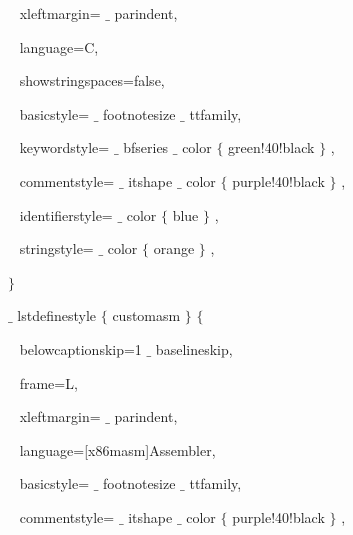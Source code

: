 {\fontsize{10pt}{10pt}\selectfont ~ xleftmargin= $ \_ $ parindent,}\par

{\fontsize{10pt}{10pt}\selectfont ~ language=C,}\par

{\fontsize{10pt}{10pt}\selectfont ~ showstringspaces=false,}\par

{\fontsize{10pt}{10pt}\selectfont ~ basicstyle= $ \_ $ footnotesize $ \_ $ ttfamily,}\par

{\fontsize{10pt}{10pt}\selectfont ~ keywordstyle= $ \_ $ bfseries $ \_ $ color $ \{ $ green!40!black $ \} $ ,}\par

{\fontsize{10pt}{10pt}\selectfont ~ commentstyle= $ \_ $ itshape $ \_ $ color $ \{ $ purple!40!black $ \} $ ,}\par

{\fontsize{10pt}{10pt}\selectfont ~ identifierstyle= $ \_ $ color $ \{ $ blue $ \} $ ,}\par

{\fontsize{10pt}{10pt}\selectfont ~ stringstyle= $ \_ $ color $ \{ $ orange $ \} $ ,}\par

{\fontsize{10pt}{10pt}\selectfont  $ \} $ }\par

{\fontsize{10pt}{10pt}\selectfont  $ \_ $ lstdefinestyle $ \{ $ customasm $ \} $  $ \{ $ }\par

{\fontsize{10pt}{10pt}\selectfont ~ belowcaptionskip=1 $ \_ $ baselineskip,}\par

{\fontsize{10pt}{10pt}\selectfont ~ frame=L,}\par

{\fontsize{10pt}{10pt}\selectfont ~ xleftmargin= $ \_ $ parindent,}\par

{\fontsize{10pt}{10pt}\selectfont ~ language=[x86masm]Assembler,}\par

{\fontsize{10pt}{10pt}\selectfont ~ basicstyle= $ \_ $ footnotesize $ \_ $ ttfamily,}\par

{\fontsize{10pt}{10pt}\selectfont ~ commentstyle= $ \_ $ itshape $ \_ $ color $ \{ $ purple!40!black $ \} $ ,}\par

